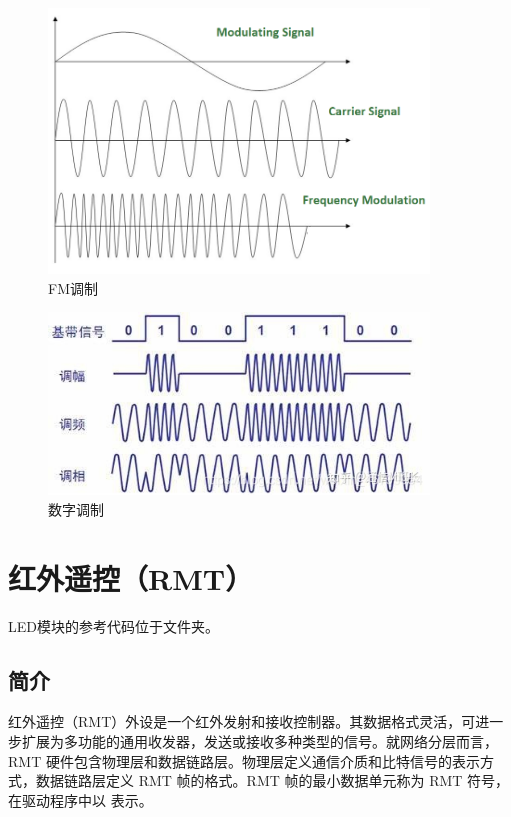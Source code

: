 \documentclass[lang=cn,newtx,10pt,scheme=chinese]{elegantbook}
\begin{document}
\begin{figure}[!htb]
\centering
\includegraphics[width=0.9\textwidth]{Frequency_Modulation.png}
\caption{FM调制}
\label{fig:FM-Modulation}
\end{figure}

\begin{figure}[!htb]
\centering
\includegraphics[width=0.9\textwidth]{RMT-4.png}
\caption{数字调制}
\end{figure}

\chapter{红外遥控（RMT）}

\begin{marker}
LED模块的参考代码位于文件夹。
\end{marker}

\section{简介}

红外遥控（RMT）外设是一个红外发射和接收控制器。其数据格式灵活，可进一步扩展为多功能的通用收发器，发送或接收多种类型的信号。就网络分层而言，RMT 硬件包含物理层和数据链路层。物理层定义通信介质和比特信号的表示方式，数据链路层定义 RMT 帧的格式。RMT 帧的最小数据单元称为 RMT 符号，在驱动程序中以  表示。
\end{document}
